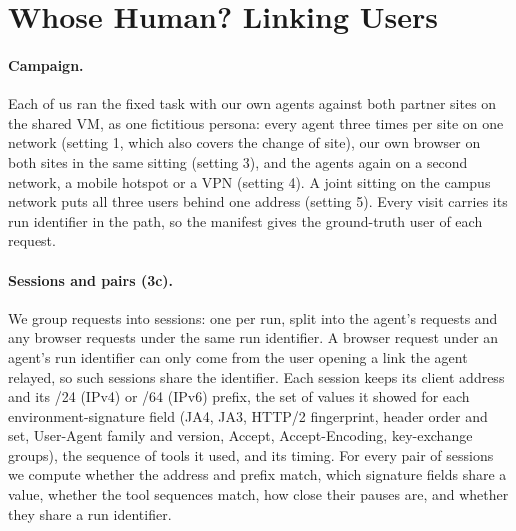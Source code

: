 
\section{Whose Human? Linking Users}
\label{sec:linking}

\paragraph{Campaign.} Each of us ran the fixed task with our own agents against both partner sites on the
shared VM, as one fictitious persona: every agent three times per site on one network (setting 1, which
also covers the change of site), our own browser on both sites in the same sitting (setting 3), and the
agents again on a second network, a mobile hotspot or a VPN (setting 4). A joint sitting on the campus
network puts all three users behind one address (setting 5). Every visit carries its run identifier in
the path, so the manifest gives the ground-truth user of each request.

\paragraph{Sessions and pairs (3c).} We group requests into sessions: one per run, split into the
agent's requests and any browser requests under the same run identifier. A browser request under an
agent's run identifier can only come from the user opening a link the agent relayed, so such sessions
share the identifier. Each session keeps its client address and its /24 (IPv4) or /64 (IPv6) prefix,
the set of values it showed for each environment-signature field (JA4, JA3, HTTP/2 fingerprint, header
order and set, User-Agent family and version, Accept, Accept-Encoding, key-exchange groups), the
sequence of tools it used, and its timing. For every pair of sessions we compute whether the address and
prefix match, which signature fields share a value, whether the tool sequences match, how close their
pauses are, and whether they share a run identifier.


